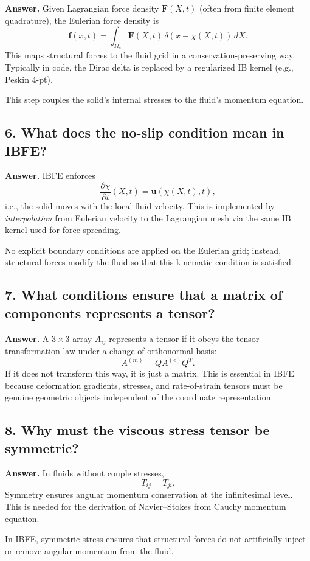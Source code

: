 \documentclass[12pt]{article}
\begin{document}
\textbf{Answer.}
Given Lagrangian force density $\mathbf{F}(X,t)$ (often from finite element
quadrature),
the Eulerian force density is
\[
\mathbf{f}(x,t) = \int_{\Omega_s}
\mathbf{F}(X,t)\,\delta(x - \chi(X,t))\,dX.
\]
This maps structural forces to the fluid grid in a conservation-preserving way.
Typically in code, the Dirac delta is replaced by a regularized IB kernel
(e.g., Peskin 4-pt).

This step couples the solid’s internal stresses to the fluid’s momentum
equation.

\subsection*{6. What does the no-slip condition mean in IBFE?}

\textbf{Answer.}
IBFE enforces
\[
\frac{\partial \chi}{\partial t}(X,t) = \mathbf{u}(\chi(X,t),t),
\]
i.e.,
the solid moves with the local fluid velocity.
This is implemented by \emph{interpolation} from Eulerian velocity to the
Lagrangian mesh via the same IB kernel used for force spreading.

No explicit boundary conditions are applied on the Eulerian grid;
instead, structural forces modify the fluid so that this kinematic condition
is satisfied.

\subsection*{7. What conditions ensure that a matrix of components represents a tensor?}

\textbf{Answer.}
A $3\times 3$ array $A_{ij}$ represents a tensor if it obeys the tensor
transformation law under a change of orthonormal basis:
\[
A^{(m)} = Q A^{(e)} Q^T.
\]
If it does not transform this way, it is just a matrix.
This is essential in IBFE because deformation gradients, stresses, and rate-of-strain
tensors must be genuine geometric objects independent of the coordinate
representation.

\subsection*{8. Why must the viscous stress tensor be symmetric?}

\textbf{Answer.}
In fluids without couple stresses,
\[
T_{ij} = T_{ji}.
\]
Symmetry ensures angular momentum conservation at the infinitesimal level.
This is needed for the derivation of Navier--Stokes from Cauchy momentum
equation.

In IBFE, symmetric stress ensures that structural forces do not artificially
inject or remove angular momentum from the fluid.
\end{document}
